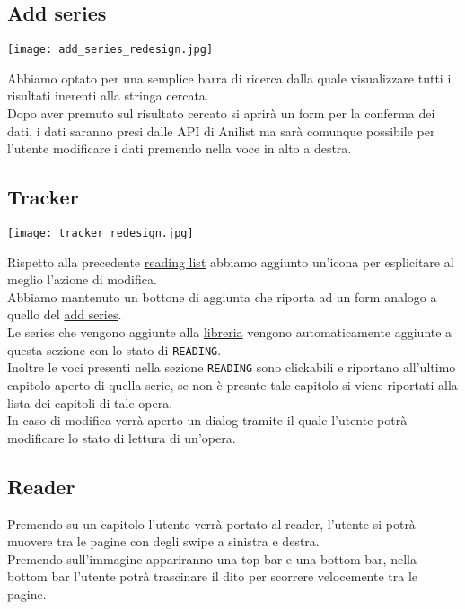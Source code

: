 \documentclass[../Assignment-3-LPSMT.tex]{subfiles}
\begin{document}
\subsection{Add series}\label{sec:add_series_redesign}

\begin{center}
   \texttt{[image: add\_series\_redesign.jpg]}
\end{center}

Abbiamo optato per una semplice barra di ricerca dalla quale visualizzare tutti i risultati inerenti alla stringa cercata.\\
Dopo aver premuto sul risultato cercato si aprirà un form per la conferma dei dati, i dati saranno presi dalle API di Anilist ma sarà comunque possibile per l'utente modificare i dati premendo nella voce in alto a destra.

\subsection{Tracker}

\begin{center}
   \texttt{[image: tracker\_redesign.jpg]}
\end{center}

 Rispetto alla precedente \hyperref[sec:reading_list]{reading list} abbiamo aggiunto un'icona per esplicitare al meglio l'azione di modifica.\\
 Abbiamo mantenuto un bottone di aggiunta che riporta ad un form analogo a quello del \hyperref[sec:add_series_redesign]{add series}.\\
 Le series che vengono aggiunte alla \hyperref[sec:home_redesign]{libreria} vengono automaticamente aggiunte a questa sezione con lo stato di \texttt{READING}.\\
 Inoltre le voci presenti nella sezione \texttt{READING} sono clickabili e riportano all'ultimo capitolo aperto di quella serie, se non è presnte tale capitolo si viene riportati alla lista dei capitoli di tale opera.\\
 In caso di modifica verrà aperto un dialog tramite il quale l'utente potrà modificare lo stato di lettura di un'opera.

\subsection{Reader}


Premendo su un capitolo l'utente verrà portato al reader, l'utente si potrà muovere tra le pagine con degli swipe a sinistra e destra.\\
Premendo sull'immagine appariranno una top bar e una bottom bar, nella bottom bar l'utente potrà trascinare il dito per scorrere velocemente tra le pagine.
\end{document}
